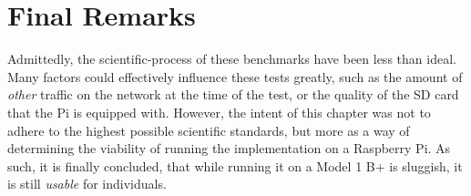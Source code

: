 	\section{Final Remarks}
		Admittedly, the scientific-process of these benchmarks have been less than ideal. Many factors could effectively influence these tests greatly, such as the amount of \emph{other} traffic on the network at the time of the test, or the quality of the SD card that the Pi is equipped with. However, the intent of this chapter was not to adhere to the highest possible scientific standards, but more as a way of determining the viability of running the implementation on a Raspberry Pi. As such, it is finally concluded, that while running it on a Model 1 B+ is sluggish, it is still \emph{usable} for individuals.